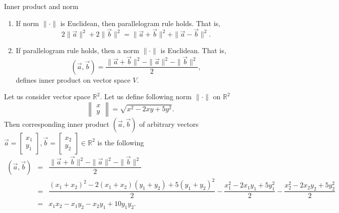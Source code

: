 \begin{theorema}{Inner product and norm}{}
\begin{enumerate}
    \item If norm $\| \cdot\|$ is Euclidean, then parallelogram rule holds. That is,
    $$
        2\|\vec{a}\|^2+2\|\vec{b}\|^2=\|\vec{a}+\vec{b}\|^2+\|\vec{a}-\vec{b}\|^2.
    $$
    \item If parallelogram rule holds, then a norm $\| \cdot\|$ is Euclidean. That is,
    $$
        (\vec{a},\vec{b})=\dfrac{\|\vec{a}+\vec{b}\|^2-\|\vec{a}\|^2-\|\vec{b}\|^2}{2},
    $$
    defines inner product on vector space $V$.
\end{enumerate}
\end{theorema}
\Ex Let us consider vector space $\mathbb{R}^2$. Let us define following norm $\|\cdot\|$ on $\mathbb{R}^2$ 
$$
    \left\| 
    \begin{matrix}
        x \\
        y
    \end{matrix}
    \right\| = \sqrt{x^2-2xy+5y^2}.
$$
Then corresponding inner product $(\vec{a},\vec{b})$ of arbitrary vectors $\vec{a}=\begin{bmatrix}
    x_1\\
    y_1
\end{bmatrix},\vec{b}=\begin{bmatrix}
    x_2\\
    y_2
\end{bmatrix}\in\mathbb{R}^2$ is the following 
\begin{eqnarray}
    (\vec{a},\vec{b})&=&\dfrac{\|\vec{a}+\vec{b}\|^2-\|\vec{a}\|^2-\|\vec{b}\|^2}{2}\nonumber\\
    &=&
    \dfrac{(x_1+x_2)^2-2(x_1+x_2)(y_1+y_2)+5(y_1+y_2)^2}{2}
    -\dfrac{x_1^2-2x_1y_1+5y_1^2}{2}
    -\dfrac{x_2^2-2x_2y_2+5y_2^2}{2}\nonumber\\
    &=&
    x_1x_2-x_1y_2-x_2y_1+10y_1y_2.\nonumber
\end{eqnarray}
